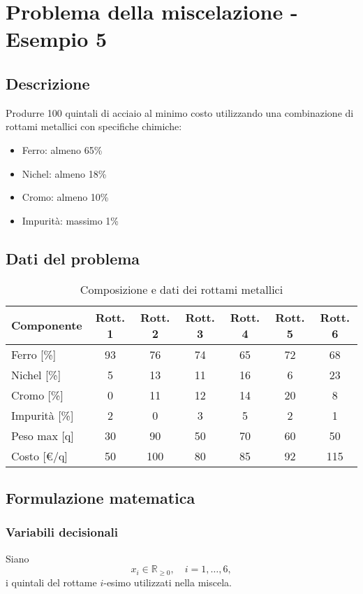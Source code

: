 \section{Problema della miscelazione - Esempio 5}

\subsection{Descrizione}
Produrre 100 quintali di acciaio al minimo costo utilizzando una combinazione di rottami metallici con specifiche chimiche:
\begin{itemize}
    \item Ferro: almeno 65\%
    \item Nichel: almeno 18\%
    \item Cromo: almeno 10\%
    \item Impurità: massimo 1\%
\end{itemize}

\subsection{Dati del problema}
\begin{table}[h]
\centering
\begin{tabular}{|l|c|c|c|c|c|c|}
\hline
\textbf{Componente} & \textbf{Rott. 1} & \textbf{Rott. 2} & \textbf{Rott. 3} & \textbf{Rott. 4} & \textbf{Rott. 5} & \textbf{Rott. 6} \\
\hline
Ferro [\%]       & 93  & 76  & 74  & 65  & 72  & 68  \\
\hline
Nichel [\%]      & 5   & 13  & 11  & 16  & 6   & 23  \\
\hline
Cromo [\%]       & 0   & 11  & 12  & 14  & 20  & 8   \\
\hline
Impurità [\%]    & 2   & 0   & 3   & 5   & 2   & 1   \\
\hline
Peso max [q]     & 30  & 90  & 50  & 70  & 60  & 50  \\
\hline
Costo [€/q]      & 50  & 100 & 80  & 85  & 92  & 115 \\
\hline
\end{tabular}
\caption{Composizione e dati dei rottami metallici}
\end{table}

\subsection{Formulazione matematica}

\subsubsection{Variabili decisionali}
Siano 
\[
x_i \in \mathbb{R}_{\geq 0}, \quad i=1,\dots,6,
\]
i quintali del rottame $i$-esimo utilizzati nella miscela.

